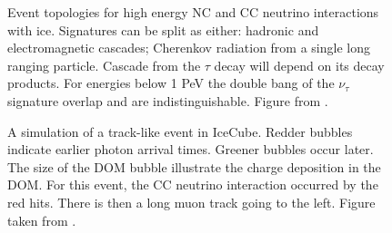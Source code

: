\begin{figure}
    \caption{Event topologies for high energy NC and CC neutrino interactions with ice. Signatures can be split as either: hadronic and electromagnetic cascades; Cherenkov radiation from a single long ranging particle. Cascade from the $\tau$ decay will depend on its decay products. For energies below 1 PeV the double bang of the $\nu_\tau$ signature overlap and are indistinguishable. Figure from \cite{rene_thesis_nutracks}.}
    \label{fig:}
\end{figure}

\begin{figure}
    \caption{A simulation of a track-like event in IceCube. Redder bubbles indicate earlier photon arrival times. Greener bubbles occur later. The size of the DOM bubble illustrate the charge deposition in the DOM. For this event, the CC neutrino interaction occurred by the red hits. There is then a long muon track going to the left. Figure taken from \cite{IC3_masterclass}.}
    \label{fig:ic3_track}
\end{figure}

